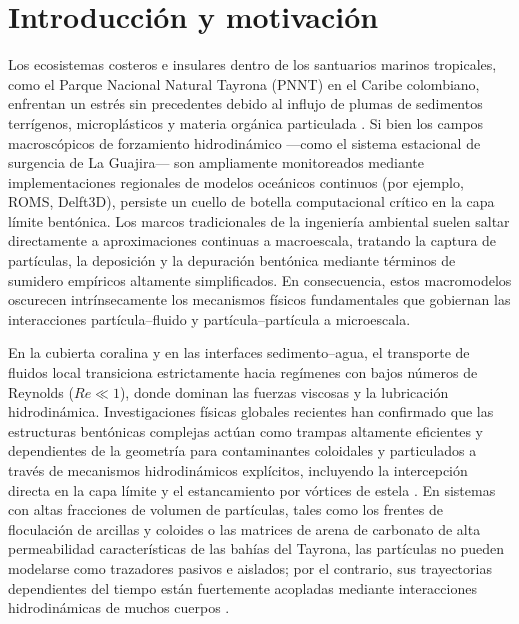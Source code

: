 \section{Introducción y motivación}
\label{sec:intro}

Los ecosistemas costeros e insulares dentro de los santuarios marinos tropicales, como el Parque Nacional Natural Tayrona (PNNT) en el Caribe colombiano, enfrentan un estrés sin precedentes debido al influjo de plumas de sedimentos terrígenos, microplásticos y materia orgánica particulada \cite{bayraktarov2014physical, montoya2018seasonal}. Si bien los campos macroscópicos de forzamiento hidrodinámico ---como el sistema estacional de surgencia de La Guajira--- son ampliamente monitoreados mediante implementaciones regionales de modelos oceánicos continuos (por ejemplo, ROMS, Delft3D), persiste un cuello de botella computacional crítico en la capa límite bentónica. Los marcos tradicionales de la ingeniería ambiental suelen saltar directamente a aproximaciones continuas a macroescala, tratando la captura de partículas, la deposición y la depuración bentónica mediante términos de sumidero empíricos altamente simplificados. En consecuencia, estos macromodelos oscurecen intrínsecamente los mecanismos físicos fundamentales que gobiernan las interacciones partícula--fluido y partícula--partícula a microescala.

En la cubierta coralina y en las interfaces sedimento--agua, el transporte de fluidos local transiciona estrictamente hacia regímenes con bajos números de Reynolds ($Re \ll 1$), donde dominan las fuerzas viscosas y la lubricación hidrodinámica. Investigaciones físicas globales recientes han confirmado que las estructuras bentónicas complejas actúan como trampas altamente eficientes y dependientes de la geometría para contaminantes coloidales y particulados a través de mecanismos hidrodinámicos explícitos, incluyendo la intercepción directa en la capa límite y el estancamiento por vórtices de estela \cite{mendrik2024microplastic}. En sistemas con altas fracciones de volumen de partículas, tales como los frentes de floculación de arcillas y coloides o las matrices de arena de carbonato de alta permeabilidad características de las bahías del Tayrona, las partículas no pueden modelarse como trazadores pasivos e aislados; por el contrario, sus trayectorias dependientes del tiempo están fuertemente acopladas mediante interacciones hidrodinámicas de muchos cuerpos \cite{brady1988stokesian}.

